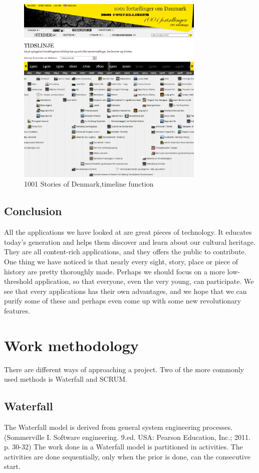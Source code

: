 \documentclass[11pt]{book}
\begin{document}
\begin{figure}[H]
      \centering
      \includegraphics[width=0.8\textwidth]{Figures/Prestudy/1001storiesWebsiteTimeline.png}
      \caption{1001 Stories of Denmark,timeline function}
      \label{fig:pre_1001StoriesDenmarkTimeLine}
\end{figure}

\subsection{Conclusion}
All the applications we have looked at are great pieces of technology. It educates today's generation and helps them discover and learn about our cultural heritage. They are all content-rich applications, and they offers the public to contribute. One thing we have noticed is that nearly every sight, story, place or piece of history are pretty thoroughly made. Perhaps we should focus on a more low-threshold application, so that everyone, even the very young, can participate.
We see that every applications has their own advantages, and we hope that we can purify some of these and perhaps even come up with some new revolutionary features.


\section{Work methodology}
There are different ways of approaching a project. Two of the more commonly used methods is Waterfall and SCRUM.

\subsection{Waterfall}
The Waterfall model is derived from general system engineering processes. (Sommerville I. Software engineering. 9.ed. USA: Pearson Education, Inc.; 2011. p. 30-32) The work done in a Waterfall model is partitioned in activities. The activities are done sequentially, only when the prior is done, can the consecutive start.
\end{document}
